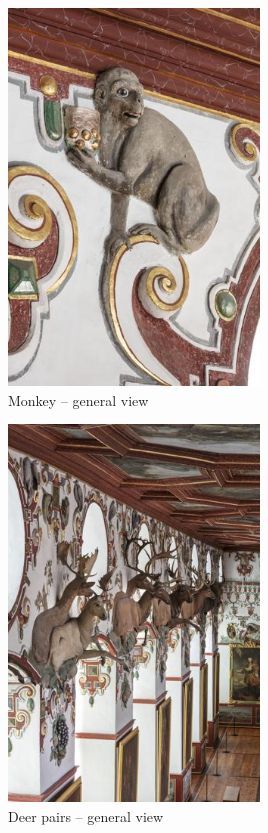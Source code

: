 \documentclass[
  a4paper,
  openany]{book}
\begin{document}
\begin{figure}[H]
\centering
\includegraphics[height=10cm]{./images/fmd10005867a.jpg}
\caption{Monkey – general view}
\label{fig:{https://previous.bildindex.de/bilder/fmd10005867a.jpg}}
\end{figure}

\clearpage

\begin{figure}[H]
\centering
\includegraphics[height=10cm]{./images/fmd10005866a.jpg}
\caption{Deer pairs – general view}
\label{fig:{https://previous.bildindex.de/bilder/fmd10005866a.jpg}}
\end{figure}

\clearpage
\end{document}
